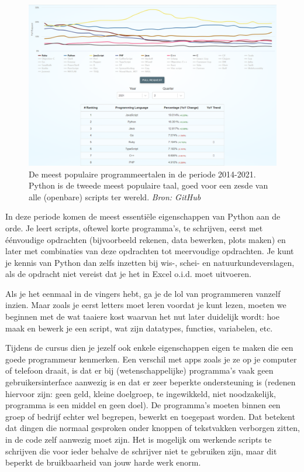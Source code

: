 \documentclass[a4paper,11pt, fleqn]{article}
\begin{document}
\begin{figure}[h]
	\includegraphics[width=16cm]{fig/github_languages.png}
	\caption{De meest populaire programmeertalen in de periode 2014-2021. Python is de tweede meest populaire taal, goed voor een zesde van alle (openbare) scripts ter wereld. \textit{Bron: GitHub}}
	\label{github-languages}
\end{figure}

In deze periode komen de meest essenti\"ele eigenschappen van Python aan de orde. Je leert scripts, oftewel korte programma's, te schrijven, eerst met \'e\'envoudige opdrachten (bijvoorbeeld rekenen, data bewerken, plots maken) en later met combinaties van deze opdrachten tot meervoudige opdrachten. Je kunt je kennis van Python dan zelfs inzetten bij wis-, schei- en natuurkundeverslagen, als de opdracht niet vereist dat je het in Excel o.i.d. moet uitvoeren.

Als je het eenmaal in de vingers hebt, ga je de lol van programmeren vanzelf inzien. Maar zoals je eerst letters moet leren voordat je kunt lezen, moeten we beginnen met de wat taaiere kost waarvan het nut later duidelijk wordt: hoe maak en bewerk je een script, wat zijn datatypes, functies, variabelen, etc.

Tijdens de cursus dien je jezelf ook enkele eigenschappen eigen te maken die een goede programmeur kenmerken. Een verschil met apps zoals je ze op je computer of telefoon draait, is dat er bij (wetenschappelijke) programma's vaak geen gebruikersinterface aanwezig is en dat er zeer beperkte ondersteuning is (redenen hiervoor zijn: geen geld, kleine doelgroep, te ingewikkeld, niet noodzakelijk, programma is een middel en geen doel). De programma's moeten binnen een groep of bedrijf echter wel begrepen, bewerkt en toegepast worden. Dat betekent dat dingen die normaal gesproken onder knoppen of tekstvakken verborgen zitten, in de code zelf aanwezig moet zijn. Het is mogelijk om werkende scripts te schrijven die voor ieder behalve de schrijver niet te gebruiken zijn, maar dit beperkt de bruikbaarheid van jouw harde werk enorm. 
\end{document}
